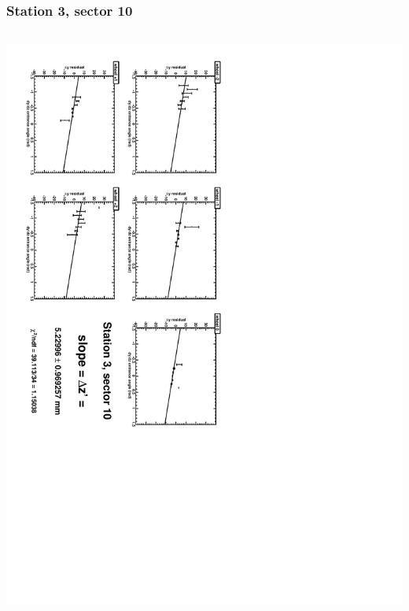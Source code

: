 \documentclass[compress]{beamer}
\begin{document}
\begin{frame}
\frametitle{Station 3, sector 10}
\begin{columns}
\includegraphics[height=\linewidth, angle=90]{zfits/zfit_3_10.pdf}


\end{columns}
\end{frame}
\end{document}
